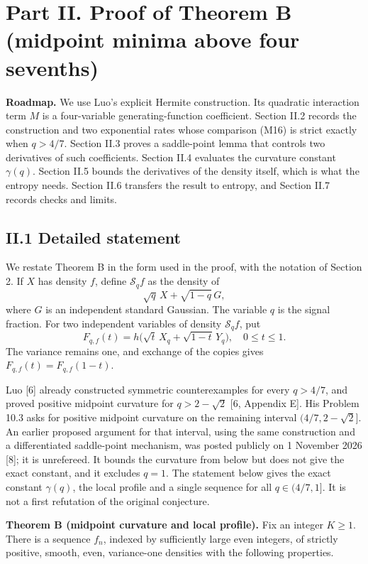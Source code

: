 \documentclass[
  british,
  10pt,
]{article}
\begin{document}
\section{Part II. Proof of Theorem B (midpoint minima above four
sevenths)}\label{part-ii.-proof-of-theorem-b-midpoint-minima-above-four-sevenths}

\textbf{Roadmap.} We use Luo's explicit Hermite construction. Its
quadratic interaction term \(M\) is a four-variable generating-function
coefficient. Section II.2 records the construction and two exponential
rates whose comparison (M16) is strict exactly when \(q>4/7\). Section
II.3 proves a saddle-point lemma that controls two derivatives of such
coefficients. Section II.4 evaluates the curvature constant
\(\gamma(q)\). Section II.5 bounds the derivatives of the density
itself, which is what the entropy needs. Section II.6 transfers the
result to entropy, and Section II.7 records checks and limits.

\subsection{II.1 Detailed statement}\label{ii.1-detailed-statement}

We restate Theorem B in the form used in the proof, with the notation of
Section 2. If \(X\) has density \(f\), define \(\mathcal S_qf\) as the
density of \[
\sqrt q\,X+\sqrt{1-q}\,G,
\] where \(G\) is an independent standard Gaussian. The variable \(q\)
is the signal fraction. For two independent variables of density
\(\mathcal S_qf\), put \[
F_{q,f}(t)=h\bigl(\sqrt t\,X_q+\sqrt{1-t}\,Y_q\bigr),
\quad 0\le t\le1.
\] The variance remains one, and exchange of the copies gives
\(F_{q,f}(t)=F_{q,f}(1-t)\).

Luo {[}6{]} already constructed symmetric counterexamples for every
\(q>4/7\), and proved positive midpoint curvature for \(q>2-\sqrt2\)
{[}6, Appendix E{]}. His Problem 10.3 asks for positive midpoint
curvature on the remaining interval \((4/7,2-\sqrt2]\). An earlier
proposed argument for that interval, using the same construction and a
differentiated saddle-point mechanism, was posted publicly on 1 November
2026 {[}8{]}; it is unrefereed. It bounds the curvature from below but
does not give the exact constant, and it excludes \(q=1\). The statement
below gives the exact constant \(\gamma(q)\), the local profile and a
single sequence for all \(q\in(4/7,1]\). It is not a first refutation of
the original conjecture.

\textbf{Theorem B (midpoint curvature and local profile).} Fix an
integer \(K\ge1\). There is a sequence \(f_n\), indexed by sufficiently
large even integers, of strictly positive, smooth, even, variance-one
densities with the following properties.
\end{document}
